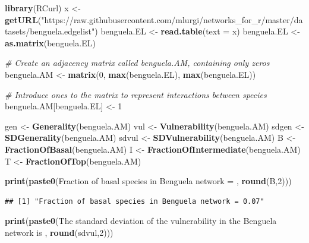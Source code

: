 \documentclass[
]{article}
\newenvironment{Shaded}{\begin{snugshade}}{\end{snugshade}}
\newcommand{\AttributeTok}[1]{\textcolor[rgb]{0.13,0.29,0.53}{#1}}
\newcommand{\CommentTok}[1]{\textcolor[rgb]{0.56,0.35,0.01}{\textit{#1}}}
\newcommand{\DecValTok}[1]{\textcolor[rgb]{0.00,0.00,0.81}{#1}}
\newcommand{\FunctionTok}[1]{\textcolor[rgb]{0.13,0.29,0.53}{\textbf{#1}}}
\newcommand{\NormalTok}[1]{#1}
\newcommand{\OtherTok}[1]{\textcolor[rgb]{0.56,0.35,0.01}{#1}}
\newcommand{\StringTok}[1]{\textcolor[rgb]{0.31,0.60,0.02}{#1}}
\begin{document}
\begin{Shaded}
\begin{Highlighting}[]
\FunctionTok{library}\NormalTok{(RCurl)}
\NormalTok{x }\OtherTok{\textless{}{-}} \FunctionTok{getURL}\NormalTok{(}\StringTok{"https://raw.githubusercontent.com/mlurgi/networks\_for\_r/master/datasets/benguela.edgelist"}\NormalTok{)}
\NormalTok{benguela.EL }\OtherTok{\textless{}{-}} \FunctionTok{read.table}\NormalTok{(}\AttributeTok{text =}\NormalTok{ x) }
\NormalTok{benguela.EL }\OtherTok{\textless{}{-}} \FunctionTok{as.matrix}\NormalTok{(benguela.EL)}

\CommentTok{\# Create an adjacency matrix called benguela.AM, containing only zeros}
\NormalTok{benguela.AM }\OtherTok{\textless{}{-}} \FunctionTok{matrix}\NormalTok{(}\DecValTok{0}\NormalTok{, }\FunctionTok{max}\NormalTok{(benguela.EL), }\FunctionTok{max}\NormalTok{(benguela.EL))}

\CommentTok{\# Introduce ones to the matrix to represent interactions between species}
\NormalTok{benguela.AM[benguela.EL] }\OtherTok{\textless{}{-}} \DecValTok{1}

\NormalTok{gen }\OtherTok{\textless{}{-}} \FunctionTok{Generality}\NormalTok{(benguela.AM)}
\NormalTok{vul }\OtherTok{\textless{}{-}} \FunctionTok{Vulnerability}\NormalTok{(benguela.AM)}
\NormalTok{sdgen }\OtherTok{\textless{}{-}} \FunctionTok{SDGenerality}\NormalTok{(benguela.AM)}
\NormalTok{sdvul }\OtherTok{\textless{}{-}} \FunctionTok{SDVulnerability}\NormalTok{(benguela.AM)}
\NormalTok{B }\OtherTok{\textless{}{-}} \FunctionTok{FractionOfBasal}\NormalTok{(benguela.AM)}
\NormalTok{I }\OtherTok{\textless{}{-}} \FunctionTok{FractionOfIntermediate}\NormalTok{(benguela.AM)}
\NormalTok{T }\OtherTok{\textless{}{-}} \FunctionTok{FractionOfTop}\NormalTok{(benguela.AM)}

\FunctionTok{print}\NormalTok{(}\FunctionTok{paste0}\NormalTok{(}\StringTok{\textquotesingle{}Fraction of basal species in Benguela network = \textquotesingle{}}\NormalTok{, }\FunctionTok{round}\NormalTok{(B,}\DecValTok{2}\NormalTok{)))}
\end{Highlighting}
\end{Shaded}

\begin{verbatim}
## [1] "Fraction of basal species in Benguela network = 0.07"
\end{verbatim}

\begin{Shaded}
\begin{Highlighting}[]
\FunctionTok{print}\NormalTok{(}\FunctionTok{paste0}\NormalTok{(}\StringTok{\textquotesingle{}The standard deviation of the vulnerability in the Benguela network is \textquotesingle{}}\NormalTok{, }\FunctionTok{round}\NormalTok{(sdvul,}\DecValTok{2}\NormalTok{)))}
\end{Highlighting}
\end{Shaded}
\end{document}
